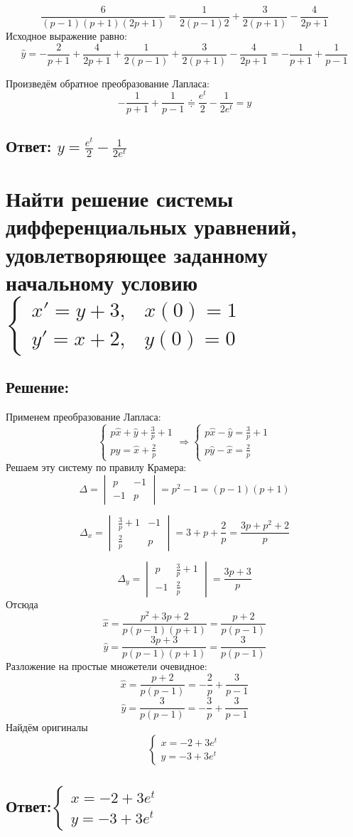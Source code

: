 \documentclass{article}
\begin{document}
	\[\frac{6}{(p-1)(p+1)(2p+1)} = \frac{1}{2(p-1)2} + \frac{3}{2(p+1)} - \frac{4}{2p+1}\]
	Исходное выражение равно:
	\[\hat{y} = -\frac{2}{p+1} + \frac{4}{2p+1} + \frac{1}{2(p-1)} + \frac{3}{2(p+1)} - \frac{4}{2p+1} = -\frac{1}{p+1}  + \frac{1}{p-1}\]
	
	Произведём  обратное преобразование Лапласа:
	\[ -\frac{1}{p+1}  + \frac{1}{p-1}  \doteqdot \frac{e^t}{2} - \frac{1}{2e^t} = y\]
	
	\subsection{Ответ: $y =\frac{e^t}{2} - \frac{1}{2e^t}$}
	
	\section{Найти решение системы дифференциальных уравнений, удовлетворяющее заданному начальному условию $\begin{cases}
			x'=y+3,& x(0) =1 \\
			y'=x+2,& y(0)=0
		\end{cases}$}
	\subsection{Решение:}
	Применем преобразование Лапласа:
	\[\begin{cases}
		p\hat{x} + \hat{y} + \frac{3}{p} + 1 \\
		p\hat{y} = \hat{x} + \frac{2}{p}
	\end{cases} \Rightarrow \begin{cases}
	p\hat{x} - \hat{y} = \frac{3}{p} + 1\\
	p\hat{y} - \hat{x} = \frac{2}{p}
	\end{cases}\]
	Решаем эту систему по правилу Крамера:
	\[\Delta = \begin{vmatrix}
		p & -1 \\
		-1 & p
	\end{vmatrix} = p^2 -1 = (p-1)(p+1)\]
	
	\[\Delta_x = \begin{vmatrix}
		\frac{3}{p} + 1 & -1\\
		\frac{2}{p} & p
	\end{vmatrix} = 3+p +\frac{2}{p} = \frac{3p + p^2 + 2}{p}\]
	
	\[\Delta_y =\begin{vmatrix}
		p & \frac{3}{p} + 1\\
		-1 & \frac{2}{p}
	\end{vmatrix} = \frac{3p+3}{p}\]
	Отсюда
	\[\hat{x} = \frac{p^2+3p+2}{p(p-1)(p+1)} = \frac{p+2}{p(p-1)}\]
	\[\hat{y} = \frac{3p+3}{p(p-1)(p+1)} = \frac{3}{p(p-1)}\]
	Разложение на простые множетели очевидное:
	\[\hat{x} = \frac{p+2}{p(p-1)} = -\frac{2}{p} + \frac{3}{p-1}\]
	\[\hat{y} = \frac{3}{p(p-1)} = -\frac{3}{p} + \frac{3}{p-1}\]
	Найдём оригиналы 
	\[\begin{cases}
		x = -2 + 3e^{t} \\
		y = -3 + 3e^t
	\end{cases}\]
	
	\subsection{Ответ:$\begin{cases}
			x = -2 + 3e^{t} \\
			y = -3 + 3e^t
		\end{cases}$}
\end{document}
